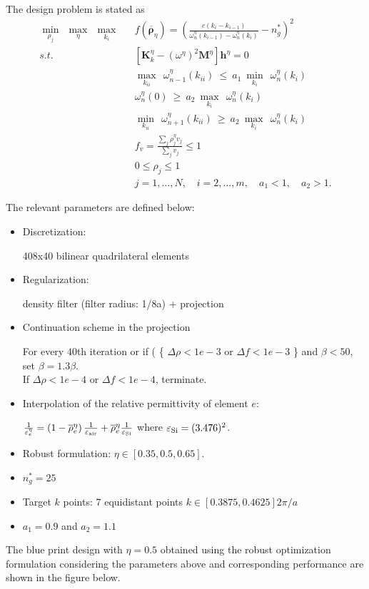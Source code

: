 \documentclass{article}
\begin{document}
The design problem is stated as
\begin{eqnarray}
	\min_{\rho_j} \ \ \max_{\eta}\ \ \max_{k_i} && f\left(\overline{\boldsymbol{\rho}}_\eta\right)= \left(\frac{c\left(k_i-k_{i-1}\right)}{{\omega}^{\eta}_n\left(k_{i-1}\right)-{\omega}^{\eta}_n\left(k_i\right)}-n^*_g\right)^2 \nonumber \\
	s.t.  && \left[ \mathbf{K}^{\eta}_k - \left({\omega}^{\eta} \right)^2 \mathbf{M}^{\eta} \right]\mathbf{h}^{\eta}=0  \nonumber \\
	&&  \max_{k_{ii}} \ \  {{\omega}^{\eta}_{n-1}\left(k_{ii}\right)} \  \leq \ a_1 \  \min_{k_i} \ \ {{\omega}^{\eta}_n\left(k_i\right)} \nonumber \\
	&&   {{\omega}^{\eta}_{n}\left(0\right)} \  \geq \ a_2 \ \max_{k_i} \ \ {{\omega}^{\eta}_n\left(k_i\right)}  \nonumber \\
	&& \min_{k_{ii}} \ \  {{\omega}^{\eta}_{n+1}\left(k_{ii}\right)} \  \geq \ a_2 \ \max_{k_i} \ \ {{\omega}^{\eta}_n\left(k_i\right)} \nonumber \\
	&&  f_v =\frac{\sum_{j} \overline{\rho}^{\eta}_j v_j}{\sum_{j} v_j }\leq 1 \nonumber \\
	&&   0\leq \rho_j \leq 1 \nonumber\\
	&& j=1,\ldots,N, \quad i=2,\ldots,m, \quad a_1 < 1, \quad a_2>1 . 
\end{eqnarray} 

The relevant parameters are defined below:
 
\begin{itemize}
	\item Discretization:
	
	 408x40 bilinear quadrilateral elements
	
\item 	Regularization: 

	density filter (filter radius: 1/8a) + projection
	\item Continuation scheme in the projection
	
	 For every $40$th iteration or if ( \{ $\Delta \rho< 1e-3$ or $\Delta f <1e-3$ \} and $\beta < 50$,   set $\beta=1.3 \beta$.  \\
  If $\Delta \rho < 1e-4$ or $\Delta f < 1e-4 $,  terminate. 

\item Interpolation of the relative permittivity of element $e$: 

$\frac{1}{\varepsilon^{\eta}_e} = \left(1- \overline{\rho}^{\eta}_e \right)\frac{1}{\varepsilon_{\rm{air}}} +\overline{\rho}^{\eta}_e  \frac{1}{\varepsilon_{\rm{Si}}}$ where $\varepsilon_{\rm{Si}}=(3.476)^2$.
\item 	Robust formulation: $ \eta \in [0.35, 0.5, 0.65]$.

\item $n^*_g=25$
\item Target $k$ points:
7  equidistant points $k \in [0.3875, 0.4625]2{\pi}/a$ 
\item $a_1=0.9$ and $a_2=1.1$
\end{itemize}
The blue print design  with $\eta=0.5$ obtained using the robust optimization formulation considering the parameters above and corresponding performance are shown in the figure below. 
 
\end{document}
